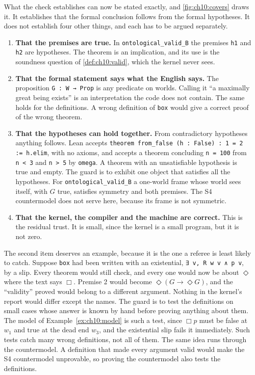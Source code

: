 What the check establishes can now be stated exactly, and \cref{fig:ch10:covers} draws it. It establishes that the formal conclusion follows from the formal hypotheses. It does not establish four other things, and each has to be argued separately.
\begin{enumerate}[leftmargin=*]
\item \textbf{That the premises are true.} In \texttt{ontological\_valid\_B} the premises \texttt{h1} and \texttt{h2} are hypotheses. The theorem is an implication, and its use is the soundness question of \cref{def:ch10:valid}, which the kernel never sees.
\item \textbf{That the formal statement says what the English says.} The proposition \texttt{G : W → Prop} is any predicate on worlds. Calling it ``a maximally great being exists'' is an interpretation the code does not contain. The same holds for the definitions. A wrong definition of \texttt{box} would give a correct proof of the wrong theorem.
\item \textbf{That the hypotheses can hold together.} From contradictory hypotheses anything follows. Lean accepts \texttt{theorem from\_false (h : False) : 1 = 2 := h.elim}, with no axioms, and accepts a theorem concluding \texttt{n = 100} from \texttt{n < 3} and \texttt{n > 5} by \texttt{omega}. A theorem with an unsatisfiable hypothesis is true and empty. The guard is to exhibit one object that satisfies all the hypotheses. For \texttt{ontological\_valid\_B} a one-world frame whose world sees itself, with $G$ true, satisfies symmetry and both premises. The S4 countermodel does not serve here, because its frame is not symmetric.
\item \textbf{That the kernel, the compiler and the machine are correct.} This is the residual trust. It is small, since the kernel is a small program, but it is not zero.
\end{enumerate}
The second item deserves an example, because it is the one a referee is least likely to catch. Suppose \texttt{box} had been written with an existential, \texttt{∃ v, R w v ∧ p v}, by a slip. Every theorem would still check, and every one would now be about $\Diamond$ where the text says $\Box$. Premise 2 would become $\Diamond(G\to\Diamond G)$, and the ``validity'' proved would belong to a different argument. Nothing in the kernel's report would differ except the names. The guard is to test the definitions on small cases whose answer is known by hand before proving anything about them. The model of Example~\ref{ex:ch10:model} is such a test, since $\Box p$ must be false at $w_1$ and true at the dead end $w_3$, and the existential slip fails it immediately. Such tests catch many wrong definitions, not all of them. The same idea runs through the countermodel. A definition that made every argument valid would make the S4 countermodel unprovable, so proving the countermodel also tests the definitions.

